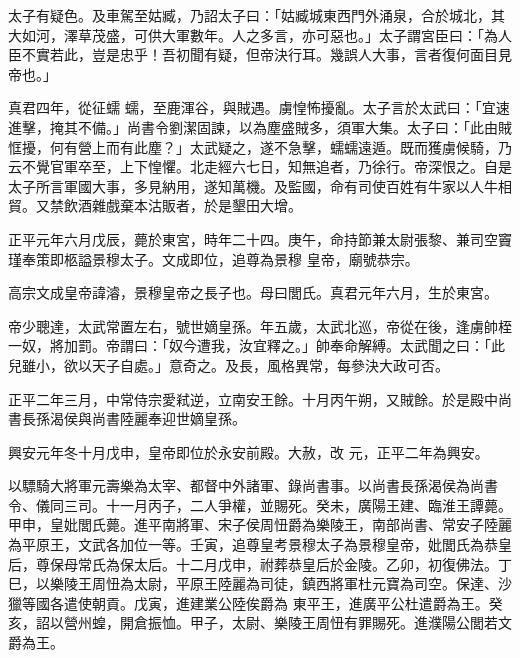 \begin{pinyinscope}
 太子有疑色。及車駕至姑臧，乃詔太子曰：「姑臧城東西門外涌泉，合於城北，其大如河，澤草茂盛，可供大軍數年。人之多言，亦可惡也。」太子謂宮臣曰：「為人臣不實若此，豈是忠乎！吾初聞有疑，但帝決行耳。幾誤人大事，言者復何面目見帝也。」



 真君四年，從征蠕
 蠕，至鹿渾谷，與賊遇。虜惶怖擾亂。太子言於太武曰：「宜速進擊，掩其不備。」尚書令劉潔固諫，以為塵盛賊多，須軍大集。太子曰：「此由賊恇擾，何有營上而有此塵？」太武疑之，遂不急擊，蠕蠕遠遁。既而獲虜候騎，乃云不覺官軍卒至，上下惶懼。北走經六七日，知無追者，乃徐行。帝深恨之。自是太子所言軍國大事，多見納用，遂知萬機。及監國，命有司使百姓有牛家以人牛相貿。又禁飲酒雜戲棄本沽販者，於是墾田大增。



 正平元年六月戊辰，薨於東宮，時年二十四。庚午，命持節兼太尉張黎、兼司空竇瑾奉策即柩謚景穆太子。文成即位，追尊為景穆
 皇帝，廟號恭宗。



 高宗文成皇帝諱濬，景穆皇帝之長子也。母曰閭氏。真君元年六月，生於東宮。



 帝少聰達，太武常置左右，號世嫡皇孫。年五歲，太武北巡，帝從在後，逢虜帥桎一奴，將加罰。帝謂曰：「奴今遭我，汝宜釋之。」帥奉命解縛。太武聞之曰：「此兒雖小，欲以天子自處。」意奇之。及長，風格異常，每參決大政可否。



 正平二年三月，中常侍宗愛弒逆，立南安王餘。十月丙午朔，又賊餘。於是殿中尚書長孫渴侯與尚書陸麗奉迎世嫡皇孫。



 興安元年冬十月戊申，皇帝即位於永安前殿。大赦，改
 元，正平二年為興安。



 以驃騎大將軍元壽樂為太宰、都督中外諸軍、錄尚書事。以尚書長孫渴侯為尚書令、儀同三司。十一月丙子，二人爭權，並賜死。癸未，廣陽王建、臨淮王譚薨。甲申，皇妣閭氏薨。進平南將軍、宋子侯周忸爵為樂陵王，南部尚書、常安子陸麗為平原王，文武各加位一等。壬寅，追尊皇考景穆太子為景穆皇帝，妣閭氏為恭皇后，尊保母常氏為保太后。十二月戊申，祔葬恭皇后於金陵。乙卯，初復佛法。丁巳，以樂陵王周忸為太尉，平原王陸麗為司徒，鎮西將軍杜元寶為司空。保達、沙獵等國各遣使朝貢。戊寅，進建業公陸俟爵為
 東平王，進廣平公杜遣爵為王。癸亥，詔以營州蝗，開倉振恤。甲子，太尉、樂陵王周忸有罪賜死。進濮陽公閭若文爵為王。




\end{pinyinscope}
